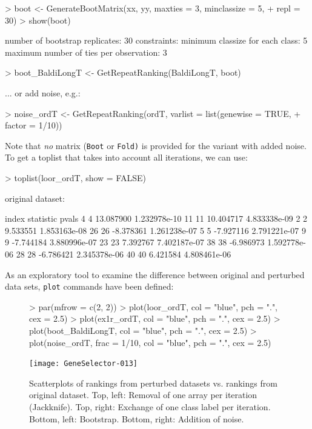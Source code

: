 \begin{Schunk}
\begin{Sinput}
> boot <- GenerateBootMatrix(xx, yy, maxties = 3, minclassize = 5, 
+     repl = 30)
> show(boot)
\end{Sinput}
\begin{Soutput}
number of bootstrap replicates: 30
constraints: minimum classize for each class: 5
 	     maximum number of ties per observation: 3
\end{Soutput}
\begin{Sinput}
> boot_BaldiLongT <- GetRepeatRanking(BaldiLongT, boot)
\end{Sinput}
\end{Schunk}
... or add noise, e.g.:

\begin{Schunk}
\begin{Sinput}
> noise_ordT <- GetRepeatRanking(ordT, varlist = list(genewise = TRUE, 
+     factor = 1/10))
\end{Sinput}
\end{Schunk}
Note that \emph{no} matrix (\texttt{Boot} or \texttt{Fold)}  is provided for the variant with added noise.\\
To get a toplist that takes into account all iterations, we can use:
\begin{Schunk}
\begin{Sinput}
> toplist(loor_ordT, show = FALSE)
\end{Sinput}
\begin{Soutput}
original dataset: 
 
   index statistic        pvals
4      4 13.087900 1.232978e-10
11    11 10.404717 4.833338e-09
2      2  9.533551 1.853163e-08
26    26 -8.378361 1.261238e-07
5      5 -7.927116 2.791221e-07
9      9 -7.744184 3.880996e-07
23    23  7.392767 7.402187e-07
38    38 -6.986973 1.592778e-06
28    28 -6.786421 2.345378e-06
40    40  6.421584 4.808461e-06
\end{Soutput}
\end{Schunk}

As an exploratory tool to examine the difference between original
and perturbed data sets, \texttt{plot} commands have been defined:


\begin{figure}[h!]
\centering
\begin{Schunk}
\begin{Sinput}
> par(mfrow = c(2, 2))
> plot(loor_ordT, col = "blue", pch = ".", cex = 2.5)
> plot(ex1r_ordT, col = "blue", pch = ".", cex = 2.5)
> plot(boot_BaldiLongT, col = "blue", pch = ".", cex = 2.5)
> plot(noise_ordT, frac = 1/10, col = "blue", pch = ".", cex = 2.5)
\end{Sinput}
\end{Schunk}
\texttt{[image: GeneSelector-013]}
\caption{Scatterplots of rankings from perturbed datasets vs. rankings
from original dataset. Top, left: Removal of one array per iteration (Jackknife).
Top, right: Exchange of one class label per iteration.
Bottom, left: Bootstrap. Bottom, right: Addition of noise.}
\label{fig:scatterplot}
\end{figure}

